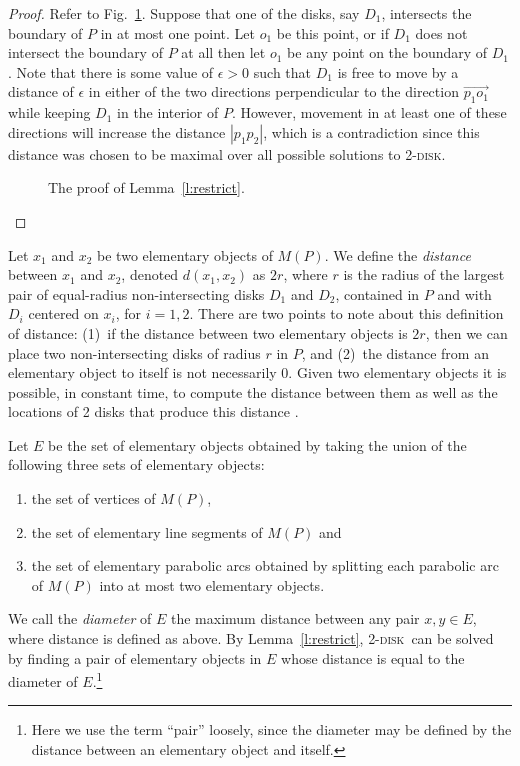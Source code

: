 \documentclass[twoside]{report}
\newcommand{\centeripe}[1]{\begin{center}\Ipe{#1}\end{center}}
\newcommand{\figlabel}[1]{\label{fig:#1}}
\newcommand{\figref}[1]{\mbox{Fig.~\ref{fig:#1}}}
\newcommand{\tdisk}{\textsc{2-disk}}
\begin{document}
\begin{paper}
\begin{proof}
  Refer to \figref{restrict}. Suppose that one of the disks, say
  $D_1$, intersects the boundary of $P$ in at most one point.  Let
  $o_1$ be this point, or if $D_1$ does not intersect the boundary of
  $P$ at all then let $o_1$ be any point on the boundary of $D_1$.
  Note that there is some value of $\epsilon>0$ such that $D_1$ is
  free to move by a distance of $\epsilon$ in either of the two
  directions perpendicular to the direction $\overrightarrow{p_1o_1}$
  while keeping $D_1$ in the interior of $P$. However, movement in at
  least one of these directions will increase the distance $|p_1p_2|$,
  which is a contradiction since this distance was chosen to be
  maximal over all possible solutions to \tdisk.
  \begin{figure}
    \centeripe{movement}
    \caption{The proof of Lemma~\ref{l:restrict}.}
    \figlabel{restrict}
  \end{figure}
\end{proof}

Let $x_1$ and $x_2$ be two elementary objects of $M(P)$.  We define
the \emph{distance} between $x_1$ and $x_2$, denoted $d(x_1,x_2)$ as
$2r$, where $r$ is the radius of the largest pair of equal-radius
non-intersecting disks $D_1$ and $D_2$, contained in $P$ and with
$D_i$ centered on $x_i$, for $i=1,2$. There are two points to note
about this definition of distance: (1)~if the distance between two
elementary objects is $2r$, then we can place two non-intersecting
disks of radius $r$ in $P$, and (2)~the distance from an elementary
object to itself is not necessarily 0.  Given two elementary objects
it is possible, in constant time, to compute the distance between them
as well as the locations of 2 disks that produce this distance
\cite{bddlt98}.

Let $E$ be the set of elementary objects obtained by taking the union
of the following three sets of elementary objects:

\begin{enumerate}
\item the set of vertices of $M(P)$,
\item the set of elementary line segments of $M(P)$ and
\item the set of elementary parabolic arcs obtained by splitting
  each parabolic arc of $M(P)$ into at most two elementary objects.
\end{enumerate}

We call the \emph{diameter} of $E$ the maximum distance between any pair
$x,y\in E$, where distance is defined as above.  By Lemma~\ref{l:restrict},
\tdisk\ can be solved by finding a pair of elementary objects in $E$ whose
distance is equal to the diameter of $E$.\footnote{Here we use the term
``pair'' loosely, since the diameter may be defined by the distance between an
elementary object and itself.}


\end{paper}
\end{document}
